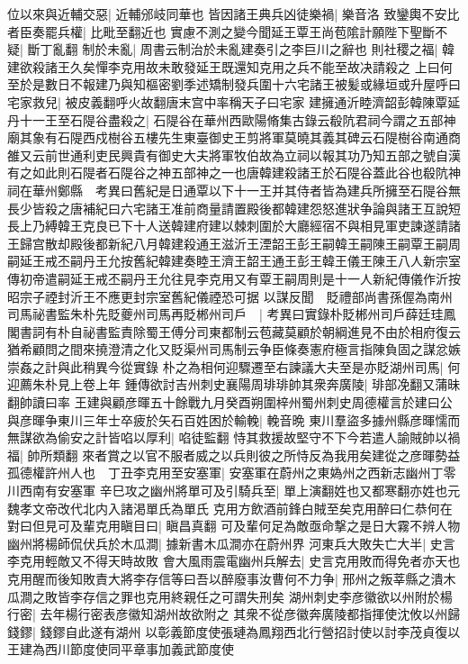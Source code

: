 位以來與近輔交惡|{
	近輔邠岐同華也}
皆因諸王典兵凶徒樂禍|{
	樂音洛}
致鑾輿不安比者臣奏罷兵權|{
	比毗至翻近也}
實慮不測之變今聞延王覃王尚苞隂計願陛下聖斷不疑|{
	斷丁亂翻}
制於未亂|{
	周書云制治於未亂建奏引之李巨川之辭也}
則社稷之福|{
	韓建欲殺諸王久矣憚李克用故未敢發延王既還知克用之兵不能至故决請殺之}
上曰何至於是數日不報建乃與知樞密劉季述矯制發兵圍十六宅諸王被髪或緣垣或升屋呼曰宅家救兒|{
	被皮義翻呼火故翻唐末宫中率稱天子曰宅家}
建擁通沂睦濟韶彭韓陳覃延丹十一王至石隄谷盡殺之|{
	石隄谷在華州西歐陽脩集古錄云殽阬君祠今謂之五部神廟其象有石隄西戍樹谷五樓先生東臺御史王剪將軍莫曉其義其碑云石隄樹谷南通商雒又云前世通利吏民興貴有御史大夫將軍牧伯故為立祠以報其功乃知五部之號自漢有之如此則石隄者石隄谷之神五部神之一也唐韓建殺諸王於石隄谷蓋此谷也殽阬神祠在華州鄭縣　考異曰舊紀是日通覃以下十一王并其侍者皆為建兵所擁至石隄谷無長少皆殺之唐補紀曰六宅諸王准前商量請置殿後都韓建怨怒進狀争論與諸王互說短長上乃縛韓王克良已下十人送韓建府建以棘刺圍於大廳經宿不與相見軍吏諫遂請諸王歸宫散却殿後都新紀八月韓建殺通王滋沂王湮韶王彭王嗣韓王嗣陳王嗣覃王嗣周嗣延王戒丕嗣丹王允按舊紀韓建奏睦王濟王韶王通王彭王韓王儀王陳王八人新宗室傳初帝遣嗣延王戒丕嗣丹王允往見李克用又有覃王嗣周則是十一人新紀傳儀作沂按昭宗子禋封沂王不應更封宗室舊紀儀禋恐可据}
以謀反聞　貶禮部尚書孫偓為南州司馬祕書監朱朴先貶夔州司馬再貶郴州司戶　|{
	考異曰實錄朴貶郴州司戶薛廷珪鳳閣書詞有朴自祕書監責除蜀王傅分司東都制云苞藏莫顧於朝綱進見不由於相府復云猶希顧問之間來撓澄清之化又貶渠州司馬制云争臣條奏憲府極言指陳負固之謀忿嫉崇姦之計與此稍異今從實錄}
朴之為相何迎驟遷至右諫議大夫至是亦貶湖州司馬|{
	何迎薦朱朴見上卷上年}
鍾傳欲討吉州刺史襄陽周琲琲帥其衆奔廣陵|{
	琲部凂翻又蒲昧翻帥讀曰率}
王建與顧彦暉五十餘戰九月癸酉朔圍梓州蜀州刺史周德權言於建曰公與彦暉争東川三年士卒疲於矢石百姓困於輸輓|{
	輓音晩}
東川羣盜多據州縣彦暉懦而無謀欲為偷安之計皆啗以厚利|{
	啗徒監翻}
恃其救援故堅守不下今若遣人諭賊帥以禍福|{
	帥所類翻}
來者賞之以官不服者威之以兵則彼之所恃反為我用矣建從之彦暉勢益孤德權許州人也　丁丑李克用至安塞軍|{
	安塞軍在蔚州之東媯州之西新志幽州丁零川西南有安塞軍}
辛巳攻之幽州將單可及引騎兵至|{
	單上演翻姓也又都寒翻亦姓也元魏孝文帝改代北内入諸渇單氏為單氏}
克用方飲酒前鋒白賊至矣克用醉曰仁恭何在對曰但見可及輩克用瞋目曰|{
	瞋昌真翻}
可及輩何足為敵亟命撃之是日大霧不辨人物幽州將楊師侃伏兵於木瓜澗|{
	據新書木瓜澗亦在蔚州界}
河東兵大敗失亡大半|{
	史言李克用輕敵又不得天時故敗}
會大風雨震電幽州兵解去|{
	史言克用敗而得免者亦天也}
克用醒而後知敗責大將李存信等曰吾以醉廢事汝曹何不力争|{
	邢州之叛莘縣之潰木瓜澗之敗皆李存信之罪也克用終親任之可謂失刑矣}
湖州刺史李彦徽欲以州附於楊行密|{
	去年楊行密表彦徽知湖州故欲附之}
其衆不從彦徽奔廣陵都指揮使沈攸以州歸錢鏐|{
	錢鏐自此遂有湖州}
以彰義節度使張璉為鳳翔西北行營招討使以討李茂貞復以王建為西川節度使同平章事加義武節度使

